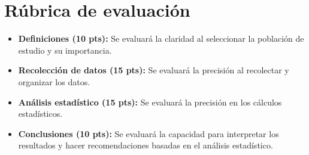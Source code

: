 \documentclass[a4,11pt]{aleph-notas}
\begin{document}
\section{Rúbrica de evaluación}
\begin{itemize}
	\item \textbf{Definiciones (10 pts):} Se evaluar\'a la claridad al seleccionar la poblaci\'on de estudio y su importancia.
	\item \textbf{Recolecci\'on de datos (15 pts):} Se evaluar\'a la precisi\'on al recolectar y organizar los datos.
	\item \textbf{An\'alisis estad\'istico (15 pts):} Se evaluar\'a la precisi\'on en los c\'alculos estad\'isticos.
	\item \textbf{Conclusiones (10 pts):} Se evaluar\'a la capacidad para interpretar los resultados y hacer recomendaciones basadas en el an\'alisis estad\'istico.
\end{itemize}
\end{document}
